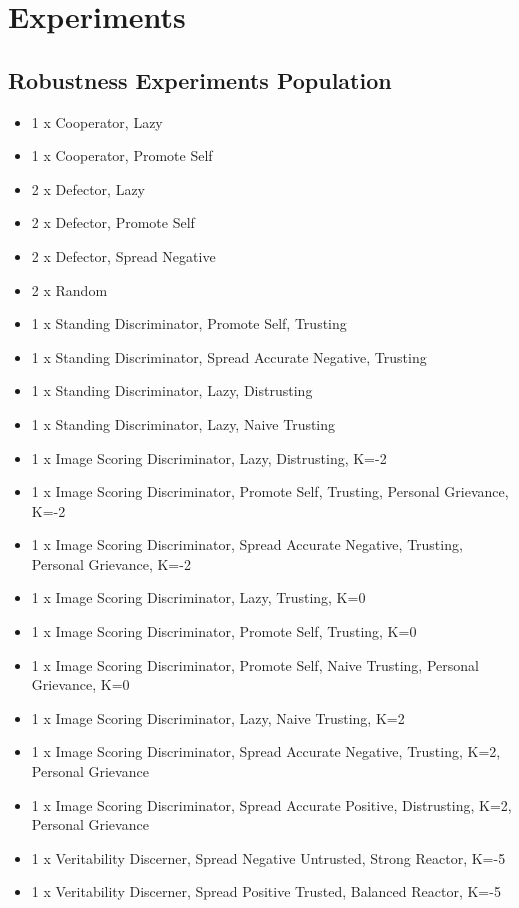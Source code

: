 \documentclass[]{final_report}
\begin{document}
\section{Experiments}
\subsection{Robustness Experiments Population}
\label{appendix:populations}
\begin{itemize}
	\item 1 x Cooperator, Lazy
	\item 1 x Cooperator, Promote Self
	\item 2 x Defector, Lazy
	\item 2 x Defector, Promote Self
	\item 2 x Defector, Spread Negative
	\item 2 x Random
	\item 1 x Standing Discriminator, Promote Self, Trusting
	\item 1 x Standing Discriminator, Spread Accurate Negative, Trusting
	\item 1 x Standing Discriminator, Lazy, Distrusting
	\item 1 x Standing Discriminator, Lazy, Naive Trusting
	\item 1 x Image Scoring Discriminator, Lazy, Distrusting, K=-2
	\item 1 x Image Scoring Discriminator, Promote Self, Trusting, Personal Grievance, K=-2
	\item 1 x Image Scoring Discriminator, Spread Accurate Negative, Trusting, Personal Grievance, K=-2
	\item 1 x Image Scoring Discriminator, Lazy, Trusting, K=0
	\item 1 x Image Scoring Discriminator, Promote Self, Trusting, K=0
	\item 1 x Image Scoring Discriminator, Promote Self, Naive Trusting, Personal Grievance, K=0
	\item 1 x Image Scoring Discriminator, Lazy, Naive Trusting, K=2
	\item 1 x Image Scoring Discriminator, Spread Accurate Negative, Trusting, K=2, Personal Grievance
	\item 1 x Image Scoring Discriminator, Spread Accurate Positive, Distrusting, K=2, Personal Grievance
	\item 1 x Veritability Discerner, Spread Negative Untrusted, Strong Reactor, K=-5
	\item 1 x Veritability Discerner, Spread Positive Trusted, Balanced Reactor, K=-5

\end{itemize}
\end{document}
